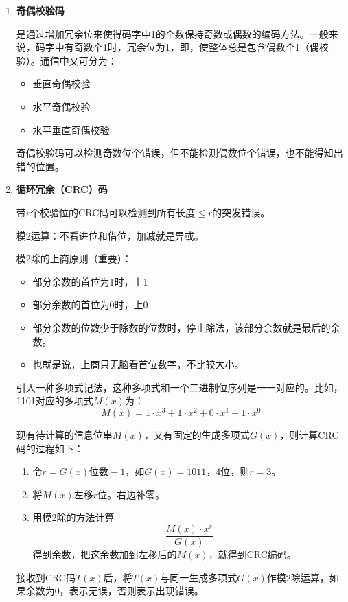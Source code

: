\documentclass[12pt, a4paper, oneside]{ctexart}
\begin{document}
\begin{enumerate}
    \item {\bf 奇偶校验码}
    
    是通过增加冗余位来使得码字中1的个数保持奇数或偶数的编码方法。一般来说，码字中有奇数个1时，冗余位为1，即，使整体总是包含偶数个1（偶校验）。通信中又可分为：
    \begin{itemize}
        \item 垂直奇偶校验
        \item 水平奇偶校验
        \item 水平垂直奇偶校验
    \end{itemize}

    奇偶校验码可以检测奇数位个错误，但不能检测偶数位个错误，也不能得知出错的位置。

    \item {\bf 循环冗余（CRC）码}
    
    带$r$个校验位的CRC码可以检测到所有长度$\leq r$的突发错误。
    
    模2运算：不看进位和借位，加减就是异或。

    模2除的上商原则（重要）：
    \begin{itemize}
        \item 部分余数的首位为1时，上1
        \item 部分余数的首位为0时，上0
        \item 部分余数的位数少于除数的位数时，停止除法，该部分余数就是最后的余数。
        \item 也就是说，上商只无脑看首位数字，不比较大小。
    \end{itemize}
    
    引入一种多项式记法，这种多项式和一个二进制位序列是一一对应的。比如，1101对应的多项式$M(x)$为：
    \begin{equation*}
        M(x)=1\cdot x^3+1\cdot x^2+0\cdot x^1+1\cdot x^0
    \end{equation*}

    现有待计算的信息位串$M(x)$，又有固定的生成多项式$G(x)$，则计算CRC码的过程如下：
    \begin{enumerate}
        \item 令$r=G(x)\text{位数}-1$，如$G(x)=1011$，4位，则$r=3$。
        \item 将$M(x)$左移$r$位。右边补零。
        \item 用模2除的方法计算
        \begin{equation*}
            \frac{M(x)\cdot x^r}{G(x)}
        \end{equation*}
        得到余数，把这余数加到左移后的$M(x)$，就得到CRC编码。
    \end{enumerate}

    接收到CRC码$T(x)$后，将$T(x)$与同一生成多项式$G(x)$作模2除运算，如果余数为0，表示无误，否则表示出现错误。
\end{enumerate}
\end{document}
